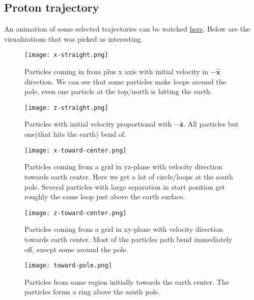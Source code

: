 \documentclass[11pt,a4paper]{article}
\begin{document}
\subsection{Proton trajectory}
An animation of some selected trajectories can be watched \href{http://www.youtube.com/watch?v=Z0PT-oyBoS0}{here}. Below are the visualizations that was picked as interesting.
\begin{figure}[htbp] %
\begin{center}
\label{figure.B-field}
\texttt{[image: x-straight.png]}
\caption{Particles coming in from plus x axis with initial velocity in $-\hat{\textbf{x}}$ direction. We can see that some particles make loops around the pole, even one particle at the top/north is hitting the earth.}
\end{center}
\end{figure}
\begin{figure}[htbp] %
\begin{center}
\label{figure.B-field}
\texttt{[image: z-straight.png]}
\caption{Particles with initial velocity proportional with $-\hat{\textbf{z}}$. All particles but one(that hits the earth) bend of.}
\end{center}
\end{figure}
\begin{figure}[htbp] %
\begin{center}
\label{figure.B-field}
\texttt{[image: x-toward-center.png]}
\caption{Particles coming from a grid in yz-plane with velocity direction towards earth center. Here we get a lot of circle/loops at the south pole. Several particles with large separation in start position get roughly the same loop just above the earth surface.}
\end{center}
\end{figure}
\begin{figure}[htbp] %
\begin{center}
\label{figure.B-field}
\texttt{[image: z-toward-center.png]}
\caption{Particles coming from a grid in xy-plane with velocity direction towards earth center. Most of the particles path bend immediately off, execpt some around the pole.}
\end{center}
\end{figure}
\begin{figure}[htbp] %
\begin{center}
\label{figure.B-field}
\texttt{[image: toward-pole.png]}
\caption{Particles from same region initially towards the earth center. The particles forms a ring above the south pole.}
\end{center}
\end{figure}
\end{document}
